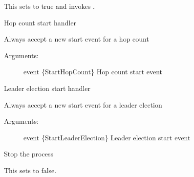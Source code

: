 \documentclass[letterpaper,10pt,english]{sphinxmanual}
\begin{document}
\begin{fulllineitems}
\begin{fulllineitems}
This sets  to true and invokes .

\end{fulllineitems}


\begin{fulllineitems}
\label{\detokenize{index:fish.Fish.start_hop_count_handler}}
Hop count start handler

Always accept a new start event for a hop count
\begin{description}
\item[{Arguments:}] \leavevmode
event \{StartHopCount\} \textendash{} Hop count start event

\end{description}

\end{fulllineitems}


\begin{fulllineitems}
\label{\detokenize{index:fish.Fish.start_leader_election_handler}}
Leader election start handler

Always accept a new start event for a leader election
\begin{description}
\item[{Arguments:}] \leavevmode
event \{StartLeaderElection\} \textendash{} Leader election start event

\end{description}

\end{fulllineitems}


\begin{fulllineitems}
\label{\detokenize{index:fish.Fish.stop}}
Stop the process

This sets  to false.


\end{fulllineitems}
\end{fulllineitems}
\end{document}
